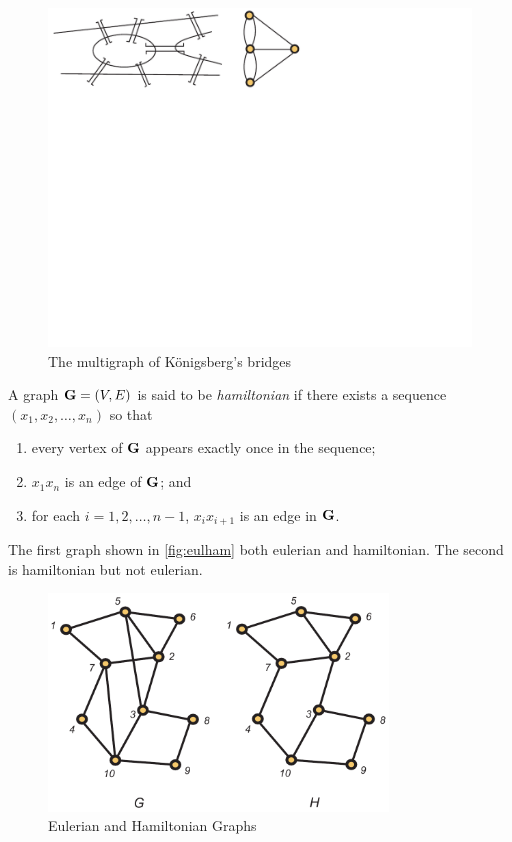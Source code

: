 \begin{figure}[h]
  \centering
  \includegraphics[clip,viewport=228 306 298 400]{graphs-figs/konigsberg}
  \caption{The multigraph of K\"onigsberg's bridges}
  \label{fig:bridges-graph}
\end{figure}

A graph $\mathbf{G}=(V,E)$ is said to be \textit{hamiltonian} if there exists a
sequence $(x_1,x_2,\dots,x_n)$ so that
\begin{enumerate}
\item every vertex of $\mathbf{G}$ appears exactly once in the sequence;
\item $x_1x_n$ is an edge of $\mathbf{G}$; and
\item for each $i=1,2,\dots,n-1$, $x_ix_{i+1}$ is an edge in $\mathbf{G}$.
\end{enumerate}

The first graph shown in \autoref{fig:eulham} both eulerian and
hamiltonian.  The second is hamiltonian but not eulerian.
\begin{figure}
\begin{center}
\includegraphics*[width=3.55in]{graphs-figs/eulerian_hamiltonian_crop}
\caption{\label{fig:eulham}Eulerian and Hamiltonian Graphs}
\end{center}
\end{figure}

